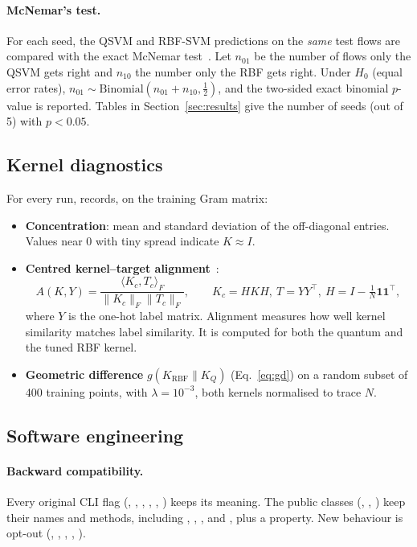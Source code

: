 \paragraph{McNemar's test.} For each seed, the QSVM and RBF-SVM predictions on the \emph{same}
test flows are compared with the exact McNemar test~\cite{mcnemar1947,dietterich1998}. Let $n_{01}$
be the number of flows only the QSVM gets right and $n_{10}$ the number only the RBF gets right.
Under $H_0$ (equal error rates), $n_{01}\sim\text{Binomial}(n_{01}+n_{10},\tfrac12)$, and the
two-sided exact binomial $p$-value is reported. Tables in Section~\ref{sec:results} give the number
of seeds (out of 5) with $p<0.05$.

\subsection{Kernel diagnostics}
For every run,  records, on the training Gram matrix:
\begin{itemize}
\item \textbf{Concentration}: mean and standard deviation of the off-diagonal entries. Values near
      0 with tiny spread indicate $K\approx I$.
\item \textbf{Centred kernel--target alignment}~\cite{cortes2012}:
      \begin{equation}
      A(K,Y)=\frac{\langle K_c, T_c\rangle_F}{\|K_c\|_F\|T_c\|_F},\qquad K_c=HKH,\ T=YY^\top,\ H=I-\tfrac1N\bm1\bm1^\top,
      \end{equation}
      where $Y$ is the one-hot label matrix. Alignment measures how well kernel similarity matches
      label similarity. It is computed for both the quantum and the tuned RBF kernel.
\item \textbf{Geometric difference} $g(K_\text{RBF}\|K_Q)$ (Eq.~\ref{eq:gd}) on a random subset of
      400 training points, with $\lambda=10^{-3}$, both kernels normalised to trace $N$.
\end{itemize}

\subsection{Software engineering}
\paragraph{Backward compatibility.} Every original CLI flag (, ,
, , , ) keeps its meaning. The
public classes (, , ) keep their names and
methods, including , ,
,  and , plus a 
property. New behaviour is opt-out (, ,
, , ).

